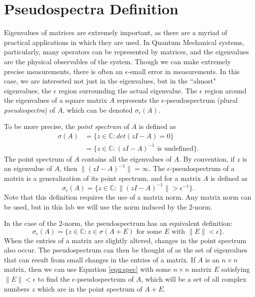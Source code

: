 \label{lab:pseudospectra}



\section*{Pseudospectra Definition}
Eigenvalues of matrices are extremely important, as there are a myriad of practical applications in which they are used.  In Quantum Mechanical systems, particularly, many operators can be represented by matrices, and the eigenvalues are the physical observables of the system.  Though we can make extremely precise measurements, there is often an $\epsilon$-small error in measurements.  In this case, we are interested not just in the eigenvalues, but in the ``almost" eigenvalues, the $\epsilon$ region surrounding the actual eigenvalue.  The $\epsilon$ region around the eigenvalues of a square matrix $A$ represents the $\epsilon$-pseudospectrum (plural \emph{pseudospectra}) of $A$, which can be denoted $\sigma_{\epsilon}(A)$.

To be more precise, the \emph{point spectrum} of $A$ is defined as
\begin{align*}
	\sigma(A)&=\{z \in \mathbb{C}: det(zI-A)=0\}\\
	&=\{z \in \mathbb{C}: (zI-A)^{-1} \text{ is undefined}\}.
\end{align*}
The point spectrum of $A$ contains all the eigenvalues of $A$.  By convention, if $z$ is an eigenvalue of $A$, then $\|(zI-A)^{-1}\|=\infty$.
The $\epsilon$-pseudospectrum of a matrix is a generalization of its point spectrum, and for a matrix $A$ is defined as
\begin{equation}
	\sigma_{\epsilon}(A)=\{z \in \mathbb{C}:\|(zI-A)^{-1}\| > \epsilon^{-1}\}.
\end{equation}
Note that this definition requires the use of a matrix norm. Any matrix norm can be used, but in this lab we will use the norm induced by the 2-norm.

In the case of the 2-norm, the pseudospectrum has an equivalent definition:
\begin{equation}
	\label{equ:spec}
	\sigma_{\epsilon}(A)=\{z \in \mathbb{C}: z \in \sigma(A+E) \text{ for some $E$ with } \|E\|<\epsilon\}.
\end{equation}
When the entries of a matrix are slightly altered, changes in the point spectrum also occur.  The pseudospectrum can then be thought of as the set of eigenvalues that can result from small changes in the entries of a matrix.  If $A$ is an $n \times n$ matrix, then we can use Equation \ref{equ:spec} with some $n \times n$ matrix $E$ satisfying $\lVert E \rVert < \epsilon$ to find the $\epsilon$-pseudospectrum of $A$, which will be a set of all complex numbers $z$ which are in the point spectrum of $A+E$.

